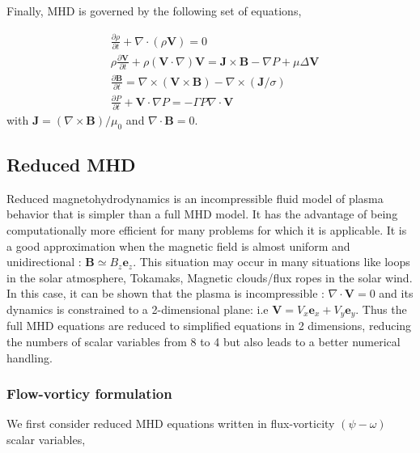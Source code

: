 \documentclass[12pt,openany]{amsbook}
\newcommand{\bbm}[1]{{\mathbf{#1}}}
\begin{document}
Finally, MHD is governed by the following set of equations,

\begin{align}
    & \frac{\partial \rho}{\partial t} + \nabla \cdot ( \rho \bbm V ) = 0 \\
    & \rho \frac{\partial \bbm V}{\partial t} + \rho ( \bbm V \cdot \nabla)\bbm V  =  \bbm J \times \bbm B - \nabla P + \mu \Delta \bbm V \\
    & \frac{\partial \bbm B}{\partial t}  = \nabla \times( \bbm V \times \bbm B) - \nabla \times (\bbm J/\sigma) \\
    & \frac{\partial P}{\partial t} + \bbm V \cdot \nabla P  = - \Gamma P \nabla \cdot \bbm V
\end{align}
with $\bbm J = (\nabla \times \bbm B) / \mu_0$  and $\nabla \cdot \bbm B = 0$.

\subsection{Reduced MHD}

Reduced magnetohydrodynamics is an incompressible fluid model of plasma behavior that is simpler than a full MHD model. 
It has the advantage of being computationally more efficient for many problems for which it is applicable.
It is a good approximation when the magnetic field is almost 
uniform and unidirectional : $ \bbm B \simeq B_z  \bbm e_z$. This situation may occur in many situations 
like loops in the solar atmosphere, Tokamaks, Magnetic clouds/flux ropes in the solar wind.\\

In this case, it can be shown that  the plasma is incompressible : $\nabla \cdot \bbm V = 0$ 
and its dynamics is constrained to a 2-dimensional plane:  i.e $\bbm V = V_x  \bbm e_x + V_y  \bbm e_y$. Thus 
the full MHD equations are reduced to simplified  equations in 2 dimensions,  reducing the numbers of scalar variables
from 8 to 4 but also leads to a better numerical handling.\\

\subsubsection{Flow-vorticy formulation}
We first consider reduced MHD equations written in flux-vorticity $(\psi - \omega)$ scalar variables,
\end{document}
